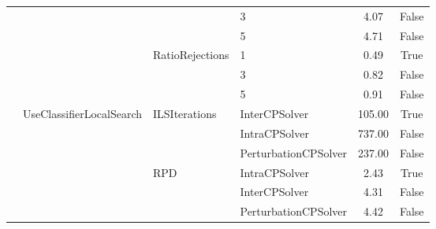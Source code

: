 \begin{table}[!ht]
\begin{tabular}{@{}l l l l c c @{}}
		                                      &                                              &                                     & 3                    & 4.07            & False           \\\cmidrule(lr){4-6}
		                                      &                                              &                                     & 5                    & 4.71            & False           \\\cmidrule(lr){3-6}
		                                      &                                              & \multirow[t]{3}{*}{RatioRejections} & 1                    & 0.49            & True            \\\cmidrule(lr){4-6}
		                                      &                                              &                                     & 3                    & 0.82            & False           \\\cmidrule(lr){4-6}
		                                      &                                              &                                     & 5                    & 0.91            & False           \\\cmidrule(lr){2-6}
		                                      & \multirow[t]{9}{*}{UseClassifierLocalSearch} & \multirow[t]{3}{*}{ILSIterations}   & InterCPSolver        & 105.00          & True            \\\cmidrule(lr){4-6}
		                                      &                                              &                                     & IntraCPSolver        & 737.00          & False           \\\cmidrule(lr){4-6}
		                                      &                                              &                                     & PerturbationCPSolver & 237.00          & False           \\\cmidrule(lr){3-6}
		                                      &                                              & \multirow[t]{3}{*}{RPD}             & IntraCPSolver        & 2.43            & True            \\\cmidrule(lr){4-6}
		                                      &                                              &                                     & InterCPSolver        & 4.31            & False           \\\cmidrule(lr){4-6}
		                                      &                                              &                                     & PerturbationCPSolver & 4.42            & False           \\\cmidrule(lr){3-6}

\end{tabular}
\end{table}
